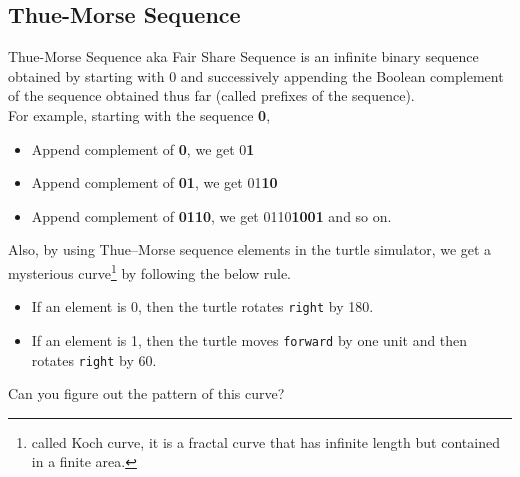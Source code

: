 \subsection{Thue-Morse Sequence}{\label{pp:thuemorsesequence}}
Thue-Morse Sequence aka Fair Share Sequence is an infinite binary sequence obtained by starting with 0 and successively appending the Boolean complement of the sequence obtained thus far (called prefixes of the sequence).\\
For example, starting with the sequence \textbf{0},
\begin{itemize}
	\item Append complement of \textbf{0}, we get 0\textbf{1}
	\item Append complement of \textbf{01}, we get 01\textbf{10}
	\item Append complement of \textbf{0110}, we get 0110\textbf{1001} and so on.
\end{itemize}
Also, by using Thue–Morse sequence elements in the turtle simulator, we get a mysterious curve\footnote{called Koch curve, it is a fractal curve that has infinite length but contained in a finite area.} by following the below rule.
\begin{itemize}
	\item If an element is 0, then the turtle rotates \verb!right! by 180\textdegree.
	\item If an element is 1, then the turtle moves \verb!forward! by one unit and then rotates \verb!right! by 60\textdegree.
\end{itemize}
Can you figure out the pattern of this curve?

